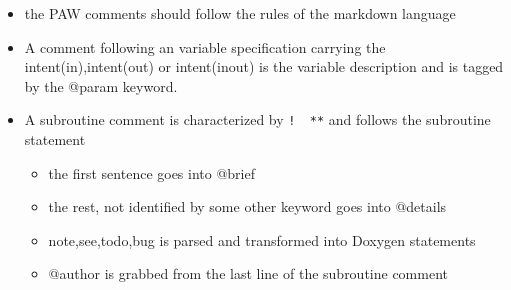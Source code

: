 \documentclass[11pt,a4paper]{report}
\begin{document}
\begin{itemize}
\item the PAW comments should follow the rules of the markdown language
\item A comment following an variable specification carrying the
  intent(in),intent(out) or intent(inout) is the variable description
  and is tagged by the @param keyword.
%
\item A subroutine comment is characterized by \verb|!  **| and
  follows the subroutine statement
\begin{itemize}
\item the first sentence goes into @brief
\item the rest, not identified by some other keyword goes into @details
\item note,see,todo,bug is parsed and transformed into Doxygen statements
\item @author is grabbed from the last line of the subroutine comment
\end{itemize}
\end{itemize}


\clearpage


\end{document}

